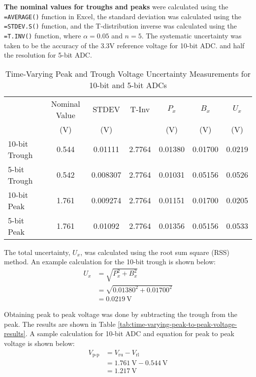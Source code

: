\noindent \textbf{The nominal values for troughs and peaks} were calculated using the \texttt{=AVERAGE()} function in Excel, the standard deviation 
was calculated using the \texttt{=STDEV.S()} function, and the T-distribution inverse was calculated using the \texttt{=T.INV()} function, where $\alpha = 0.05$ 
and $n = 5$. The systematic uncertainty was taken to be the accuracy of the 3.3V reference voltage for 10-bit ADC. and half the resolution for 5-bit ADC.

\begin{table}[h]
   \centering
   \caption{Time-Varying Peak and Trough Voltage Uncertainty Measurements for 10-bit and 5-bit ADCs}
   \label{tab:time-varying-peak-to-peak-voltage-uncertainty-measurements}
   \begin{tabular}{lcccccc}
      \toprule
      & Nominal Value & STDEV & T-Inv & $P_x$ & $B_x$ & $U_x$ \\
      & (V)           & (V)                &       & (V)   & (V)   & (V)   \\
      \midrule
      10-bit Trough & 0.544 & 0.01111 & 2.7764 & 0.01380 & 0.01700 & 0.0219 \\
      5-bit Trough  & 0.542 & 0.008307 & 2.7764 & 0.01031 & 0.05156 & 0.0526 \\
      10-bit Peak   & 1.761 & 0.009274 & 2.7764 & 0.01151 & 0.01700 & 0.0205 \\
      5-bit Peak    & 1.761 & 0.01092 & 2.7764 & 0.01356 & 0.05156 & 0.0533 \\
      \bottomrule
   \end{tabular}
\end{table}
\FloatBarrier
\noindent The total uncertainty, $U_x$, was calculated using the root sum square (RSS) method. An example calculation for the 10-bit trough is shown below:
\[
   \begin{aligned}
      U_x &= \sqrt{P_x^2 + B_x^2} \\
            &= \sqrt{0.01380^2 + 0.01700^2} \\
            &= \boxed{\qty{0.0219}{\volt}}
   \end{aligned}
\]

\noindent Obtaining peak to peak voltage was done by subtracting the trough from the peak. The results are shown in Table \ref{tab:time-varying-peak-to-peak-voltage-results}. 
A sample calculation for 10-bit ADC and equation for peak to peak voltage is shown below:
\[
\begin{aligned}
   V_{\text{p-p}} &= V_{\text{ru}} - V_{\text{rl}} \\
                  &= \qty{1.761}{\volt} - \qty{0.544}{\volt} \\
                  &= \boxed{\qty{1.217}{\volt}}
\end{aligned}
\]

